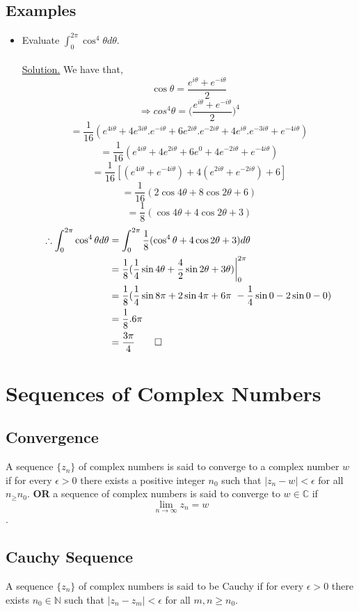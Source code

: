 \documentclass{article}
\begin{document}
\subsection{Examples}
\begin{itemize}
    \item Evaluate $\displaystyle \int_{0}^{2\pi}\cos^4\theta d\theta$.
    \\
    \\
    \underline{Solution.} We have that, 
    \[
    \cos\theta= \frac{e^{i\theta}+e^{-i\theta}}{2}
    \]
    \[
    \Rightarrow cos^4\theta= \Big(\frac{e^{i\theta}+e^{-i\theta}}{2}\Big)^4
    \]
    \[
    =\frac{1}{16}(e^{4i\theta}+4e^{3i\theta}.e^{-i\theta}+6e^{2i\theta}.e^{-2i\theta}+4e^{i\theta}.e^{-3i\theta}+e^{-4i\theta})
    \]
    \[
    =\frac{1}{16}(e^{4i\theta}+4e^{2i\theta}+6e^0+4e^{-2i\theta}+e^{-4i\theta})
    \]
    \[
    =\frac{1}{16}[(e^{4i\theta}+e^{-4i\theta})+4(e^{2i\theta}+e^{-2i\theta})+6]
    \]
    \[
    = \frac{1}{16}(2\cos4\theta+8\cos2\theta+6)
    \]
    \[
    =\frac{1}{8}(\cos4\theta+4\cos2\theta+3) 
    \]
    \begin{align}
        \therefore \displaystyle \int_{0}^{2\pi}\cos^4\theta d\theta &= \displaystyle\int_{0}^{2\pi}\frac{1}{8}(\cos^4\theta+4\cos2\theta+3)d\theta \\
        &= \frac{1}{8}(\frac{1}{4}\sin4\theta+\frac{4}{2}\sin2\theta+3\theta) \bigg|_{0}^{2\pi}\\
        &=\frac{1}{8}(\frac{1}{4}\sin8\pi+2\sin4\pi+6\pi\ -\frac{1}{4}\sin0-2\sin0-0)\\
        &=\frac{1}{8}.6\pi\\
        &=\frac{3\pi}{4} \qed
    \end{align}
\end{itemize}
\section{Sequences of Complex Numbers}
\subsection{Convergence}
A sequence $\{z_n\}$ of complex numbers is said to converge to a complex number $w$ if for every $\epsilon >0$ there exists a positive integer $n_0$ such that $|z_n-w|<\epsilon$ for all $n_\geq n_0$. \textbf{OR} a sequence of complex numbers is said to converge to $w\in \mathbb{C}$ if 
\[
\boxed{\lim_{n \to \infty}z_n=w}
\].
\subsection{Cauchy Sequence}
A sequence $\{z_n\}$ of complex numbers is said to be Cauchy if for every $\epsilon >0$ there exists $n_0 \in \mathbb{N}$ such that  $|z_n-z_m|<\epsilon$ for all $m,n\geq n_0$.
\end{document}
